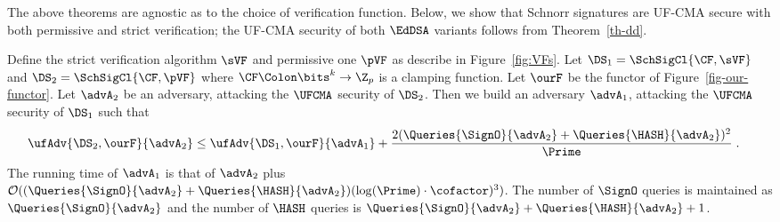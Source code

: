 





 The above theorems are agnostic as to the choice of verification function. Below, we show that Schnorr signatures are UF-CMA secure with both permissive and strict verification; the UF-CMA security of both $\EdDSA$ variants follows from Theorem~\ref{th-dd}.

\begin{theorem}\label{th-pvf-svf}  Define the strict verification algorithm $\sVF$ and permissive one $\pVF$ as describe in Figure~\ref{fig:VFs}. Let $\DS_1 = \SchSigCl{\CF,\sVF}$ and $\DS_2 = \SchSigCl{\CF,\pVF}$ where $\CF\Colon\bits^k\to\Z_p$ is a clamping function. Let $\ourF$ be the functor of Figure~\ref{fig-our-functor}. Let $\advA_2$ be an adversary, attacking the $\UFCMA$ security of $\DS_2$.
	Then we build an adversary $\advA_1$, attacking the $\UFCMA$ security of $\DS_1$ such that 
\begin{align}
	\ufAdv{\DS_2,\ourF}{\advA_2} &\leq \ufAdv{\DS_1,\ourF}{\advA_1} +  \frac{2(\Queries{\SignO}{\advA_2} + \Queries{\HASH}{\advA_2})^2}{\Prime}\;.
\end{align}
The running time of $\advA_1$ is that of $\advA_2$ plus $\mathcal{O}((\Queries{\SignO}{\advA_2} +  \Queries{\HASH}{\advA_2})(\log(\Prime) \cdot \cofactor)^3)$. 
The number of $\SignO$ queries is maintained as $\Queries{\SignO}{\advA_2}$ and the number of $\HASH$ queries is $\Queries{\SignO}{\advA_2} + \Queries{\HASH}{\advA_2} + 1$. 
\end{theorem}

